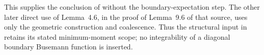 This supplies the conclusion of
\cite[Proposition~4.4]{AhlbergHoffman} without the boundary-expectation
step. The other later direct use of Lemma~4.6, in the proof of
Lemma~9.6 of that source, uses only the geometric construction and
coalescence. Thus the structural input in  retains
its stated minimum-moment scope; no integrability of a diagonal
boundary Busemann function is inserted.
